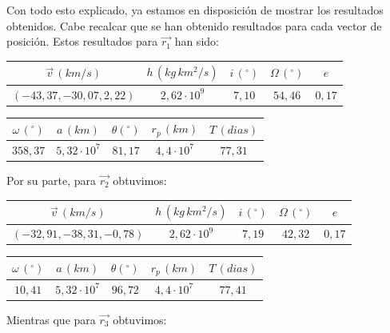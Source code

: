 \documentclass{article}
\numberwithin{equation}{section}
\begin{document}
Con todo esto explicado, ya estamos en disposición de mostrar 
los resultados obtenidos. Cabe recalcar que se han obtenido resultados 
para cada vector de posición. Estos resultados para $\overrightarrow{r_{1}}$ han sido: 
\begin{center}
    \centering
    \begin{tabular}{|c|c|c|c|c|}
    \hline
    $\overrightarrow{v}\, (km/s)$ & $h\, (kg\, km^{2}/s)$ & $i\, (^{\circ})$ & $\Omega\, (^\circ)$ & $e$ \\ \hline
    $(-43,37, -30,07, 2,22)$ & $2,62 \cdot 10^{9}$ & $7,10$ & $54,46$ & $0,17$  \\ \hline
    \end{tabular}
\end{center}

\begin{center}
    \centering
    \begin{tabular}{|c|c|c|c|c|}
    \hline
    $\omega\, (^\circ)$ & $a\, (km)$ & $\theta (^\circ)$ & $r_{p}\, (km)$ & $T\, (dias)$\\ \hline
    $358,37$ & $5,32\cdot 10^{7}$ & $81,17$ & $4,4\cdot 10^{7}$ & $77,31$ \\ \hline
    \end{tabular}
\end{center}
Por su parte, para $\overrightarrow{r_{2}}$ obtuvimos:
\newpage
\begin{center}
    \centering
    \begin{tabular}{|c|c|c|c|c|}
    \hline
    $\overrightarrow{v}\, (km/s)$ & $h\, (kg\, km^{2}/s)$ & $i\, (^{\circ})$ & $\Omega\, (^\circ)$ & $e$ \\ \hline
    $(-32,91, -38,31, -0,78)$ & $2,62 \cdot 10^{9}$ & $7,19$ & $42,32$ & $0,17$  \\ \hline
    \end{tabular}
\end{center}

\begin{center}
    \centering
    \begin{tabular}{|c|c|c|c|c|}
    \hline
    $\omega\, (^\circ)$ & $a\, (km)$ & $\theta (^\circ)$ & $r_{p}\, (km)$ & $T\, (dias)$\\ \hline
    $10,41$ & $5,32\cdot 10^{7}$ & $96,72$ & $4,4\cdot 10^{7}$ & $77,41$ \\ \hline
    \end{tabular}
\end{center}
Mientras que para $\overrightarrow{r_{3}}$ obtuvimos:
\end{document}
